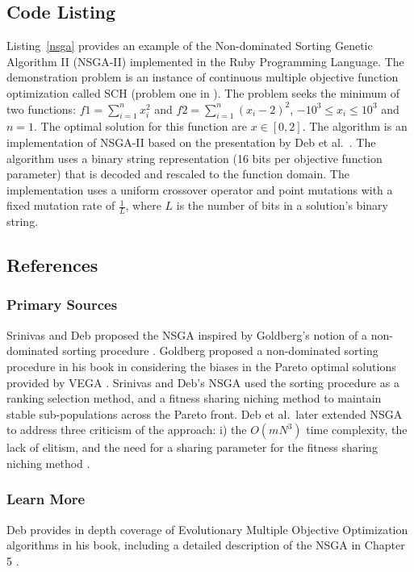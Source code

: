 \subsection{Code Listing}
Listing~\ref{nsga} provides an example of the Non-dominated Sorting Genetic Algorithm II (NSGA-II) implemented in the Ruby Programming Language.
The demonstration problem is an instance of continuous multiple objective function optimization called SCH (problem one in \cite{Deb2002}). The problem seeks the minimum of two functions: $f1=\sum_{i=1}^n x_{i}^2$ and $f2=\sum_{i=1}^n (x_{i}-2)^2$, $-10^3\leq x_i \leq 10^3$ and $n=1$. The optimal solution for this function are $x \in [0,2]$.
The algorithm is an implementation of NSGA-II based on the presentation by Deb et al.\ \cite{Deb2002}.
The algorithm uses a binary string representation (16 bits per objective function parameter) that is decoded and rescaled to the function domain. The implementation uses a uniform crossover operator and point mutations with a fixed mutation rate of $\frac{1}{L}$, where $L$ is the number of bits in a solution's binary string. 



\subsection{References}

% 
% 
\subsubsection{Primary Sources}
Srinivas and Deb proposed the NSGA inspired by Goldberg's notion of a non-dominated sorting procedure \cite{Srinivas1994}. Goldberg proposed a non-dominated sorting procedure in his book in considering the biases in the Pareto optimal solutions provided by VEGA \cite{Goldberg1989}. Srinivas and Deb's NSGA used the sorting procedure as a ranking selection method, and a fitness sharing niching method to maintain stable sub-populations across the Pareto front.
Deb et al.\ later extended NSGA to address three criticism of the approach: i) the $O(mN^3)$ time complexity, the lack of elitism, and the need for a sharing parameter for the fitness sharing niching method \cite{Deb2000, Deb2002}.

% 
% 
\subsubsection{Learn More}
Deb provides in depth coverage of Evolutionary Multiple Objective Optimization algorithms in his book, including a detailed description of the NSGA in Chapter 5 \cite{Deb2001}.
